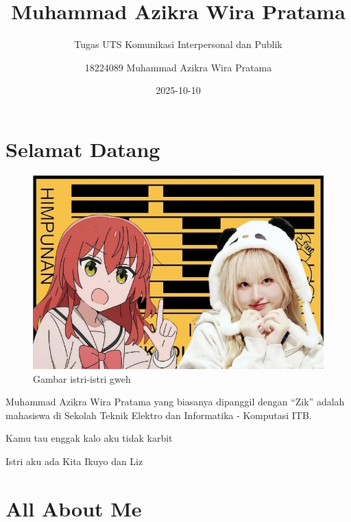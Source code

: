 \documentclass[
  letterpaper,
  DIV=11,
  numbers=noendperiod]{scrreprt}
\title{Muhammad Azikra Wira Pratama}
\subtitle{Tugas UTS Komunikasi Interpersonal dan Publik}
\author{18224089 Muhammad Azikra Wira Pratama}
\date{2025-10-10}
\renewcommand*\contentsname{Table of contents}
\newcommand\contentsname{Table of contents}
\begin{document}
\maketitle

\renewcommand*\contentsname{Table of contents}
{
\hypersetup{linkcolor=}
\setcounter{tocdepth}{2}
\tableofcontents
}


\chapter*{Selamat Datang}\label{selamat-datang}


\begin{figure}[H]

{\centering \includegraphics[width=9.5\linewidth,height=\textheight,keepaspectratio]{images/CoverIstri.jpg}

}

\caption{Gambar istri-istri gweh}

\end{figure}%

Muhammad Azikra Wira Pratama yang biasanya dipanggil dengan ``Zik''
adalah mahasiswa di Sekolah Teknik Elektro dan Informatika - Komputasi
ITB.

Kamu tau enggak kalo aku tidak karbit

Istri aku ada Kita Ikuyo dan Liz


\chapter{All About Me}\label{all-about-me}
\end{document}
